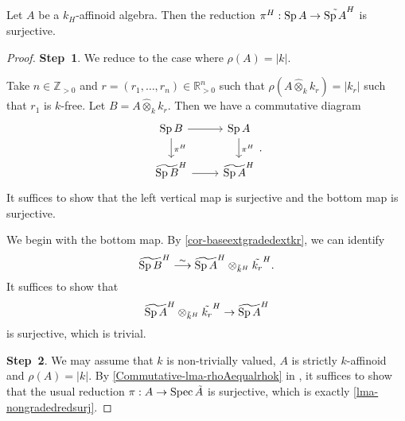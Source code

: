 \begin{thm}\label{thm-gradedreductionsurjective}
    Let $A$ be a $k_H$-affinoid algebra. Then the reduction $\pi^H:\operatorname{Sp} A\rightarrow \tilde{\operatorname{Sp} A}^H$ is surjective.
\end{thm}
\begin{proof}
    \textbf{Step~1}. We reduce to the case where $\rho(A)=|k|$.

    Take $n\in \mathbb{Z}_{>0}$ and $r=(r_1,\ldots,r_n)\in \mathbb{R}^n_{>0}$ such that $\rho(A\hat{\otimes}_k k_r)=|k_r|$ such that $r_1$ is $k$-free. Let $B=A\hat{\otimes}_k k_r$. Then we have a commutative diagram
    \[
        \begin{tikzcd}
            \Sp B \arrow[d, "\pi^H"] \arrow[r] & \Sp A \arrow[d, "\pi^H"] \\
            \widetilde{\Sp B}^H \arrow[r]      & \widetilde{\Sp A}^H     
        \end{tikzcd}.  
    \]
    It suffices to show that the left vertical map is surjective and the bottom map is surjective.

    We begin with the bottom map.
    By \cref{cor-baseextgradedextkr}, we can identify 
    \[
        \widetilde{\operatorname{Sp} B}^H \stackrel{\sim}{\longrightarrow} \widetilde{\operatorname{Sp} A}^H \otimes_{\tilde{k}^H}\tilde{k_r}^H.
    \]
    It suffices to show that 
    \[
        \widetilde{\operatorname{Sp} A}^H \otimes_{\tilde{k}^H}\tilde{k_r}^H\rightarrow  \widetilde{\operatorname{Sp} A}^H  
    \]
    is surjective, which is trivial.

    \textbf{Step~2}. We may assume that $k$ is non-trivially valued,  $A$ is strictly $k$-affinoid and  $\rho(A)=|k|$.
    By \cref{Commutative-lma-rhoAequalrhok} in , it suffices to show that the usual reduction $\pi:A\rightarrow \operatorname{Spec} \tilde{A}$ is surjective, which is exactly \cref{lma-nongradedredsurj}.
\end{proof}

